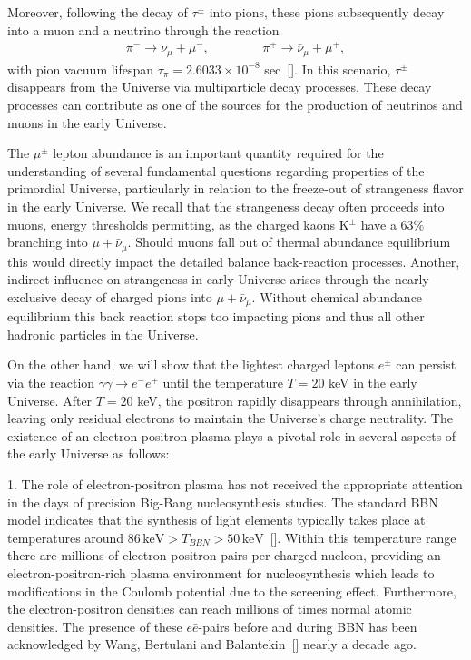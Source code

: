 Moreover, following the decay of $\tau^\pm$ into pions, these pions subsequently decay into a muon and a neutrino through the reaction
\begin{align}
\pi^-\rightarrow\nu_\mu+\mu^-,\qquad\qquad\,\pi^+\rightarrow\bar{\nu}_\mu+\mu^+,
\end{align}
with pion vacuum lifespan $\tau_\pi=2.6033\times10^{-8}$ sec~[\cite{ParticleDataGroup:2022pth}].
In this scenario, $\tau^\pm$ disappears from the Universe via multiparticle decay processes.
These decay processes can contribute as one of the sources for the production of neutrinos and muons in the early Universe.

The $\mu^\pm$ lepton abundance is an important quantity required for the understanding of several fundamental questions regarding properties of the primordial Universe,  particularly in relation to the freeze-out of strangeness flavor in the early Universe. We recall that the strangeness decay often proceeds into muons, energy thresholds permitting, as the charged kaons K$^\pm$ have a 63\% branching into $\mu+\bar \nu_\mu$. Should muons fall out of thermal abundance equilibrium this would directly impact the detailed balance back-reaction processes. Another, indirect influence on strangeness in early Universe arises through the nearly exclusive decay of charged pions into $\mu+\bar \nu_\mu$. Without chemical abundance equilibrium this back reaction stops too impacting pions and thus all other hadronic particles in the Universe. 

On the other hand, we will show that the lightest charged leptons $e^\pm$ can persist via the reaction $\gamma\gamma\to e^-e^+$ until the temperature $T=20$ keV in the early Universe.  After $T=20$ keV, the positron rapidly disappears through annihilation, leaving only residual electrons to maintain the Universe's charge neutrality. The existence of an electron-positron plasma plays a pivotal role in several aspects of the early Universe as follows: 

1. The role of electron-positron plasma has not received the appropriate attention in the days of precision Big-Bang nucleosynthesis studies. The standard BBN model indicates that the synthesis of light elements typically takes place at temperatures around  $86\,\mathrm{keV}>T_{BBN}>50\,\mathrm{keV}$~[\cite{Pitrou:2018cgg}]. Within this temperature range there are millions of electron-positron pairs per charged nucleon, providing an electron-positron-rich plasma environment for nucleosynthesis which leads to modifications in the Coulomb potential due to the screening effect. Furthermore, the electron-positron densities can reach millions of times normal atomic densities. The presence of  these $e\bar e$-pairs before and during BBN has been acknowledged by Wang, Bertulani and Balantekin~[\cite{Wang:2010px}] nearly a decade ago.


